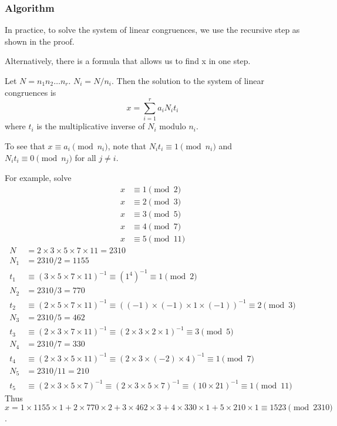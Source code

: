 \documentclass[letterpaper,12pt,oneside]{article}
\begin{document}
\subsubsection{Algorithm}
In practice, to solve the system of linear congruences, we use the recursive step as shown in the proof. 

Alternatively, there is a formula that allows us to find x in one step.

Let $N = n_1n_2\ldots n_r$. $N_i = N/n_i$. Then the solution to the system of linear congruences is \[
    x = \sum_{i=1}^r a_i N_i t_i
\]
where $t_i$ is the multiplicative inverse of $N_i$ modulo $n_i$.

To see that $x\equiv a_i \pmod {n_i}$, note that $N_i t_i \equiv 1 \pmod {n_i}$ and $N_i t_i \equiv 0 \pmod {n_j}$ for all $j\ne i$.

For example, solve \begin{align*}
    x & \equiv 1 \pmod 2 \\
    x & \equiv 2 \pmod 3 \\
    x & \equiv 3 \pmod 5 \\
    x & \equiv 4 \pmod 7 \\
    x & \equiv 5 \pmod {11}
\end{align*}
\begin{align*}
    N & = 2\times 3\times 5\times 7\times 11 = 2310 \\
    N_1 & = 2310/2 = 1155 \\
    t_1 & \equiv (3\times 5 \times 7 \times 11)^{-1} \equiv (1^4)^{-1} \equiv 1 \pmod 2 \\
    N_2 & = 2310/3 = 770 \\ 
    t_2 & \equiv (2\times 5 \times 7 \times 11)^{-1} \equiv ((-1)\times (-1)\times 1 \times (-1))^{-1} \equiv 2 \pmod 3 \\
    N_3 & = 2310/5 = 462 \\ 
    t_3 & \equiv (2\times 3 \times 7 \times 11)^{-1} \equiv (2\times 3 \times 2 \times 1)^{-1} \equiv 3 \pmod 5 \\
    N_4 & = 2310/7 = 330 \\
    t_4 & \equiv (2\times 3 \times 5 \times 11)^{-1} \equiv (2\times 3 \times (-2) \times 4)^{-1} \equiv 1 \pmod 7 \\
    N_5 & = 2310/11 = 210 \\
    t_5 & \equiv (2\times 3 \times 5 \times 7)^{-1} \equiv (2\times 3 \times 5 \times 7)^{-1} \equiv (10\times 21)^{-1} \equiv 1 \pmod {11}
\end{align*}
Thus $x = 1\times 1155\times 1 + 2\times 770\times 2 + 3\times 462\times 3 + 4\times 330\times 1 + 5\times 210\times 1 \equiv 1523 \pmod {2310}$.
\end{document}
